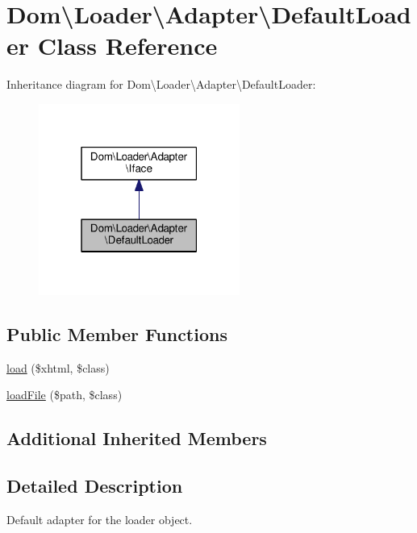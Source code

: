 \hypertarget{classDom_1_1Loader_1_1Adapter_1_1DefaultLoader}{\section{Dom\textbackslash{}Loader\textbackslash{}Adapter\textbackslash{}Default\+Loader Class Reference}
\label{classDom_1_1Loader_1_1Adapter_1_1DefaultLoader}
}


Inheritance diagram for Dom\textbackslash{}Loader\textbackslash{}Adapter\textbackslash{}Default\+Loader\+:\nopagebreak
\begin{figure}[H]
\begin{center}
\leavevmode
\includegraphics[width=187pt]{classDom_1_1Loader_1_1Adapter_1_1DefaultLoader__inherit__graph}
\end{center}
\end{figure}
\subsection*{Public Member Functions}
\begin{DoxyCompactItemize}
\item 
\hyperlink{classDom_1_1Loader_1_1Adapter_1_1DefaultLoader_af62cd152bf967d613f01d5a2385ca4ca}{load} (\$xhtml, \$class)
\item 
\hyperlink{classDom_1_1Loader_1_1Adapter_1_1DefaultLoader_aa04f96e1d4346aee79973cf2d7420181}{load\+File} (\$path, \$class)
\end{DoxyCompactItemize}
\subsection*{Additional Inherited Members}


\subsection{Detailed Description}
Default adapter for the loader object.

